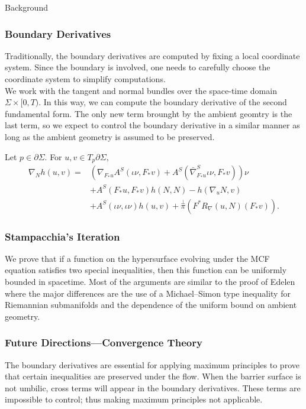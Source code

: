 \documentclass[pdf]{beamer}
\begin{document}
\begin{section}{Background}
    \begin{frame}
        \frametitle{Boundary Derivatives}
        Traditionally, the boundary derivatives are computed by fixing a local coordinate system. Since the boundary is involved, one needs to carefully choose the coordinate system to simplify computations.\\
        We work with the tangent and normal bundles over the space-time domain $\Sigma \times [0,T)$. In this way, we can compute the boundary derivative of the second fundamental form. The only new term brounght by the ambient geomtry is the last term, so we expect to control the boundary derivative in a similar manner as long as the ambient geometry is assumed to be preserved.
        \begin{theorem}
            Let $p \in \partial \Sigma$. For $u,v \in T_p \partial \Sigma $, 
    \begin{equation*}
        \begin{split}
            \nabla _N h(u,v)
            =& \left( \nabla _{F_*u}A^S(\iota \nu , F_*v)+A^S(\bar{\nabla }^{S}_{F_*u} \iota \nu , F_*v)  \right)   \nu \\
            & +A^S(F_*u, F_* v)h(N,N)-h(\nabla_u N, v) \\
            & + A^S(\iota  \nu  , \iota \nu )h(u,v) +\overset{\perp }{\pi} (F^*R_{\nabla }(u,N)(F_* v)).
    \end{split}
    \end{equation*}
        \end{theorem}
    \end{frame}

    \begin{frame}
        \frametitle{Stampacchia's Iteration}
        We prove that if a function on the hypersurface evolving under the MCF equation satisfies two special inequalities, then this function can be uniformly bounded in spacetime. Most of the arguments are similar to the proof of Edelen where the major differences are the use of a Michael--Simon type inequality for Riemannian submanifolds and the dependence of the uniform bound on ambient geometry.
    \end{frame}

    \begin{frame}
        \frametitle{Future Directions---Convergence Theory}
        The boundary derivatives are essential for applying maximum principles to prove that certain inequalities are preserved under the flow. When the barrier surface is not umbilic, cross terms will appear in the boundary derivatives. These terms are impossible to control; thus making maximum principles not applicable. 


\end{frame}
\end{section}
\end{document}
